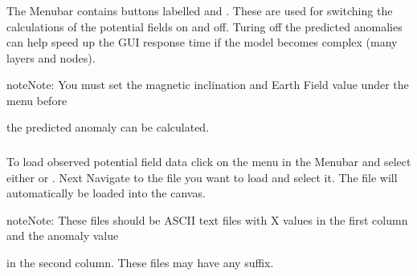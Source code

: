 \documentclass[a4paper,10pt,english]{sphinxmanual}
\begin{document}
\subsubsection{}
\label{\detokenize{manual_PF:potential-field-calculations}}
The Menubar contains buttons labelled  and .
These are used for switching the calculations of the potential fields on and off. Turing off the predicted anomalies
can help speed up the GUI response time if the model becomes complex (many layers and nodes).

\begin{sphinxadmonition}{note}{Note:}
You must set the magnetic inclination and Earth Field value under the  menu before
\end{sphinxadmonition}

the predicted anomaly can be calculated.

\begin{DUlineblock}{0em}
\item[] 
\end{DUlineblock}


\subsubsection{}
\label{\detokenize{manual_PF:loading-observed-potential-field-data}}
To load observed potential field data click on the  menu in the Menubar and select either
 or .
Next Navigate to the file you want to load and select it.
The file will automatically be loaded into the canvas.

\begin{sphinxadmonition}{note}{Note:}
These files should be ASCII text files with X values in the first column and the anomaly value
\end{sphinxadmonition}

in the second column. These files may have any suffix.


\subsection{}
\label{\detokenize{manual_segy::doc}}\label{\detokenize{manual_segy:segy-data}}
\end{document}

